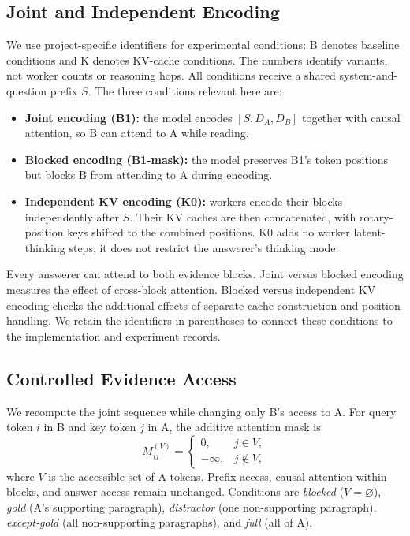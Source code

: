 \documentclass[sigconf,nonacm]{acmart}
\begin{document}
\subsection{Joint and Independent Encoding}
We use project-specific identifiers for experimental conditions: B denotes
baseline conditions and K denotes KV-cache conditions. The numbers identify
variants, not worker counts or reasoning hops. All conditions receive a
shared system-and-question prefix $S$. The three conditions relevant here are:
\begin{itemize}
\item \textbf{Joint encoding (B1):} the model encodes $[S,D_A,D_B]$
together with causal attention, so B can attend to A while reading.
\item \textbf{Blocked encoding (B1-mask):} the model preserves B1's token
positions but blocks B from attending to A during encoding.
\item \textbf{Independent KV encoding (K0):} workers encode their blocks
independently after $S$. Their KV caches are then concatenated, with
rotary-position keys shifted to the combined positions. K0 adds no worker
latent-thinking steps; it does not restrict the answerer's thinking mode.
\end{itemize}
Every answerer can attend to both evidence blocks. Joint versus blocked
encoding measures the effect of cross-block attention. Blocked versus
independent KV encoding checks the additional effects of separate cache
construction and position handling. We retain the identifiers in parentheses
to connect these conditions to the implementation and experiment records.

\subsection{Controlled Evidence Access}
We recompute the joint sequence while changing only B's access to A.
For query token $i$ in B and key token $j$ in A, the additive attention mask is
\begin{equation}
M^{(V)}_{ij}=\begin{cases}0,&j\in V,\\-\infty,&j\notin V,\end{cases}
\end{equation}
where $V$ is the accessible set of A tokens. Prefix access, causal
attention within blocks, and answer access remain unchanged. Conditions are
\emph{blocked} ($V=\varnothing$), \emph{gold} (A's supporting paragraph),
\emph{distractor} (one non-supporting paragraph), \emph{except-gold}
(all non-supporting paragraphs), and \emph{full} (all of A).
\end{document}
